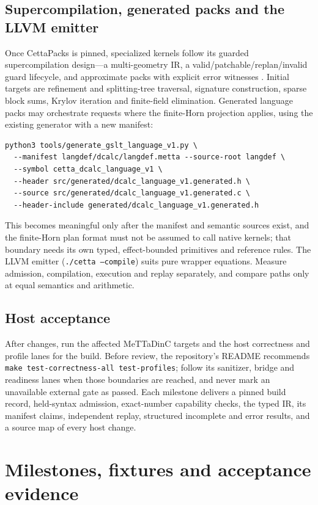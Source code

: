 \documentclass[11pt]{article}
\newcommand{\code}[1]{\texttt{#1}}
\begin{document}
\subsection{Supercompilation, generated packs and the LLVM emitter}

Once CettaPacks is pinned, specialized kernels follow its guarded supercompilation design---a
multi-geometry IR, a valid/patchable/replan/invalid guard lifecycle, and approximate packs with explicit
error witnesses \cite{cettapacks}. Initial targets are refinement and splitting-tree traversal,
signature construction, sparse block sums, Krylov iteration and finite-field elimination. Generated
language packs may orchestrate requests where the finite-Horn projection applies, using the existing
generator with a new manifest:
\begin{lstlisting}
python3 tools/generate_gslt_language_v1.py \
  --manifest langdef/dcalc/langdef.metta --source-root langdef \
  --symbol cetta_dcalc_language_v1 \
  --header src/generated/dcalc_language_v1.generated.h \
  --source src/generated/dcalc_language_v1.generated.c \
  --header-include generated/dcalc_language_v1.generated.h
\end{lstlisting}
This becomes meaningful only after the manifest and semantic sources exist, and the finite-Horn plan
format must not be assumed to call native kernels; that boundary needs its own typed, effect-bounded
primitives and reference rules. The LLVM emitter (\code{./cetta --compile}) suits pure wrapper
equations. Measure admission, compilation, execution and replay separately, and compare paths only at
equal semantics and arithmetic.

\subsection{Host acceptance}

After changes, run the affected MeTTaDinC targets and the host correctness and profile lanes for the
build. Before review, the repository's README recommends \code{make test-correctness-all test-profiles};
follow its sanitizer, bridge and readiness lanes when those boundaries are reached, and never mark an
unavailable external gate as passed. Each milestone delivers a pinned build record, held-syntax
admission, exact-number capability checks, the typed IR, its manifest claims, independent replay,
structured incomplete and error results, and a source map of every host change.

\section{Milestones, fixtures and acceptance evidence}\label{sec:milestones}
\end{document}
